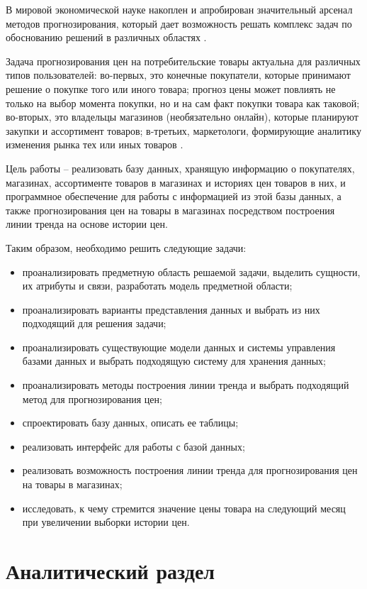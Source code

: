 \documentclass[a4paper]{bmstu}
\begin{document}
В мировой экономической науке накоплен и апробирован значительный арсенал методов прогнозирования, который дает возможность решать комплекс задач по обоснованию решений в различных областях \cite{bel-prog}.

Задача прогнозирования цен на потребительские товары актуальна для различных типов пользователей: во-первых, это конечные покупатели, которые принимают решение о покупке того или иного товара; прогноз цены может повлиять не только на выбор момента покупки, но и на сам факт покупки товара как таковой; во-вторых, это владельцы магазинов (необязательно онлайн), которые планируют закупки и ассортимент товаров; в-третьих, маркетологи, формирующие аналитику изменения рынка тех или иных товаров \cite{met-pred-online}.

Цель работы -- реализовать базу данных, хранящую информацию о покупателях, магазинах, ассортименте товаров в магазинах и историях цен товаров в них, и программное обеспечение для работы с информацией из этой базы данных, а также прогнозирования цен на товары в магазинах посредством построения линии тренда на основе истории цен.

Таким образом, необходимо решить следующие задачи:

\begin{itemize}
	\item проанализировать предметную область решаемой задачи, выделить сущности, их атрибуты и связи, разработать модель предметной области;
	\item проанализировать варианты представления данных и выбрать из них подходящий для решения задачи;
	\item проанализировать существующие модели данных и системы управления базами данных и выбрать подходящую систему для хранения данных;
	\item проанализировать методы построения линии тренда и выбрать подходящий метод для прогнозирования цен;
	\item спроектировать базу данных, описать ее таблицы;
	\item реализовать интерфейс для работы с базой данных;
	\item реализовать возможность построения линии тренда для прогнозирования цен на товары в магазинах;
	\item исследовать, к чему стремится значение цены товара на следующий месяц при увеличении выборки истории цен.
\end{itemize}
	
\chapter{Аналитический раздел}
\end{document}
